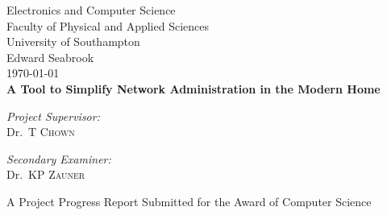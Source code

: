 
\begin{titlepage}

\begin{center}



\LARGE Electronics and Computer Science\\
Faculty of Physical and Applied Sciences\\
University of Southampton
\\[1.5cm]

Edward Seabrook\\[0.5cm]
\today \\[1cm]
{\bfseries A Tool to Simplify Network Administration in the Modern Home}\\[1.5cm]

\vfill

\begin{minipage}{0.4\textwidth}
\begin{flushleft} \large
\emph{Project Supervisor:} \\
Dr.~T \textsc{Chown}
\end{flushleft}
\end{minipage}
\begin{minipage}{0.4\textwidth}
\begin{flushright} \large
\emph{Secondary Examiner:}\\
Dr.~KP \textsc{Zauner} 
\end{flushright}
\end{minipage} 

\vfill

A Project Progress Report Submitted for the Award of Computer Science

\end{center}

\end{titlepage}
